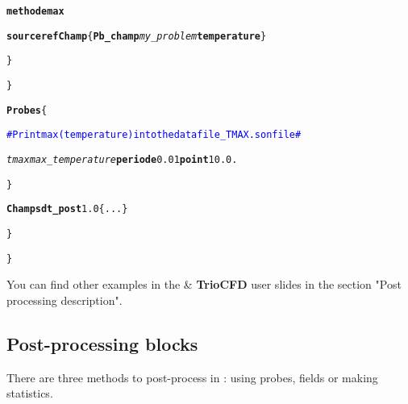 \begin{itemize}
\begin{center}
{\begin{minipage}[c]{0.9\textwidth}
\begin{alltt}
\hspace{2cm}            {\bf{methode max}}

\hspace{2cm}            {\bf{source refChamp}} \{ {\bf{Pb\_champ}} \textit{my\_problem} {\bf{temperature}} \}

\hspace{1.5cm}            \}

\hspace{1cm}        \}

\hspace{1cm}        {\bf{Probes}} \{

\hspace{1.5cm}            \textcolor{blue}{\# Print max(temperature) into the datafile\_TMAX.son file \#}

\hspace{1.5cm}            \textit{tmax} \textit{max\_temperature} {\bf{periode}} 0.01 {\bf{point}} 1 0. 0.

\hspace{1cm}        \}

\hspace{1cm}        {\bf{Champs dt\_post}} 1.0 \{ ... \}

\hspace{0.5cm}        \}

\}
\end{alltt}
\end{minipage}}
\end{center}

You can find other examples in the \trust \& \textbf{TrioCFD} user slides in the section "Post processing description".
\end{itemize}





\subsection{Post-processing blocks}
There are three methods to post-process in \trust: using probes, fields or making statistics.


